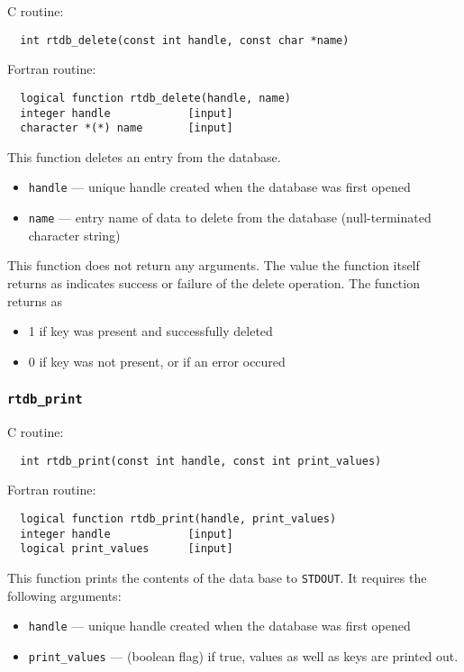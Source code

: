 C routine:

\begin{verbatim}
  int rtdb_delete(const int handle, const char *name)
\end{verbatim}


Fortran routine:

\begin{verbatim}
  logical function rtdb_delete(handle, name)
  integer handle            [input]
  character *(*) name       [input]
\end{verbatim}
This function deletes an entry from the database. 
\begin{itemize}
\item {\tt handle} --- unique handle created when the database was first opened
\item {\tt name} --- entry name of data to delete from the database (null-terminated character string)
\end{itemize}
This function does not return any arguments.  The value the function itself returns as indicates
success or failure of the delete operation.  The function returns as
\begin{itemize}
\item 1 if key was present and successfully deleted
\item 0 if key was not present, or if an error occured
\end{itemize}

\subsubsection{{\tt rtdb\_print}}

C routine:

\begin{verbatim}
  int rtdb_print(const int handle, const int print_values)
\end{verbatim}


Fortran routine:

\begin{verbatim}
  logical function rtdb_print(handle, print_values)
  integer handle            [input]
  logical print_values      [input]
\end{verbatim}
This function prints the contents of the data base to {\tt STDOUT}.  It requires
the following arguments:
\begin{itemize}
\item {\tt handle} --- unique handle created when the database was first opened
\item {\tt print\_values} --- (boolean flag) if true, values as
  well as keys are printed out.
\end{itemize}
